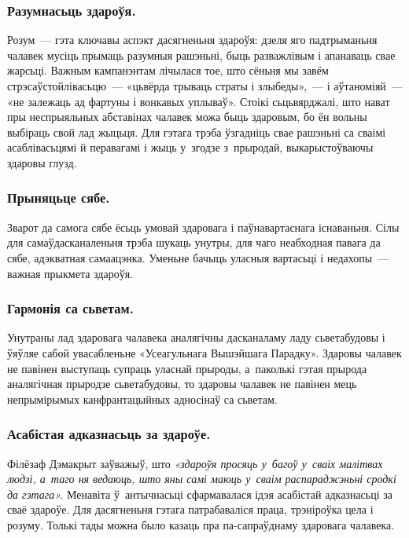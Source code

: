 \subsubsection{Разумнасьць здароўя.} 

Розум~--- гэта ключавы аспэкт дасягненьня здароўя: дзеля яго падтрыманьня чалавек мусіць прымаць разумныя рашэньні, быць разважлівым і апанаваць свае жарсьці. Важным кампанэнтам лічылася тое, што сёньня мы завём стрэсаўстойлівасьцю~--- «цьвёрда трываць страты і злыбеды»,~--- і аўтаноміяй~--- «не залежаць ад фартуны і вонкавых уплываў». Стоікі сьцьвярджалі, што нават пры неспрыяльных абставінах чалавек можа быць здаровым, бо ён вольны выбіраць свой лад жыцьця. Для гэтага трэба ўзгадніць свае рашэньні са сваімі асаблівасьцямі й перавагамі і жыць у~згодзе з~прыродай, выкарыстоўваючы здаровы глузд.

\subsubsection{Прыняцьце сябе.} 

Зварот да самога сябе ёсьць умовай здаровага і паўнавартаснага існаваньня. Сілы для самаўдасканаленьня трэба шукаць унутры, для чаго неабходная павага да сябе, адэкватная самаацэнка. Уменьне бачыць уласныя вартасьці і недахопы~--- важная прыкмета здароўя.

\subsubsection{Гармонія са сьветам.}

Унутраны лад здаровага чалавека аналягічны дасканаламу ладу сьветабудовы і ўяўляе сабой увасабленьне «Усеагульнага Вышэйшага Парадку». Здаровы чалавек не павінен выступаць супраць уласнай прыроды, а~паколькі гэтая прырода аналягічная прыродзе сьветабудовы, то здаровы чалавек не павінен мець непрымірымых канфрантацыйных адносінаў са сьветам.

\subsubsection{Асабістая адказнасьць за здароўе.} 

Філёзаф Дэмакрыт заўважыў, што \emph{«здароўя просяць у~багоў у~сваіх малітвах людзі, а~таго ня ведаюць, што яны самі маюць у~сваім распараджэньні сродкі да гэтага».} Менавіта ў~антычнасьці сфармавалася ідэя асабістай адказнасьці за сваё здароўе. Для дасягненьня гэтага патрабаваліся праца, трэніроўка цела і розуму. Толькі тады можна было казаць пра па-сапраўднаму здаровага чалавека.

